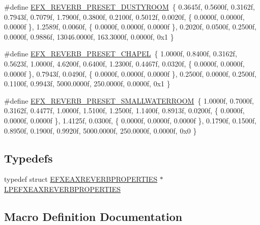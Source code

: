\begin{DoxyCompactItemize}
\item 
\#define \mbox{\hyperlink{efx-presets_8h_a89d300c1e9b8e0eef3cb9de72c18542d}{E\+F\+X\+\_\+\+R\+E\+V\+E\+R\+B\+\_\+\+P\+R\+E\+S\+E\+T\+\_\+\+D\+U\+S\+T\+Y\+R\+O\+OM}}~\{ 0.\+3645f, 0.\+5600f, 0.\+3162f, 0.\+7943f, 0.\+7079f, 1.\+7900f, 0.\+3800f, 0.\+2100f, 0.\+5012f, 0.\+0020f, \{ 0.\+0000f, 0.\+0000f, 0.\+0000f \}, 1.\+2589f, 0.\+0060f, \{ 0.\+0000f, 0.\+0000f, 0.\+0000f \}, 0.\+2020f, 0.\+0500f, 0.\+2500f, 0.\+0000f, 0.\+9886f, 13046.\+0000f, 163.\+3000f, 0.\+0000f, 0x1 \}
\item 
\#define \mbox{\hyperlink{efx-presets_8h_a60e9065d8955c7c33095c82587f815f0}{E\+F\+X\+\_\+\+R\+E\+V\+E\+R\+B\+\_\+\+P\+R\+E\+S\+E\+T\+\_\+\+C\+H\+A\+P\+EL}}~\{ 1.\+0000f, 0.\+8400f, 0.\+3162f, 0.\+5623f, 1.\+0000f, 4.\+6200f, 0.\+6400f, 1.\+2300f, 0.\+4467f, 0.\+0320f, \{ 0.\+0000f, 0.\+0000f, 0.\+0000f \}, 0.\+7943f, 0.\+0490f, \{ 0.\+0000f, 0.\+0000f, 0.\+0000f \}, 0.\+2500f, 0.\+0000f, 0.\+2500f, 0.\+1100f, 0.\+9943f, 5000.\+0000f, 250.\+0000f, 0.\+0000f, 0x1 \}
\item 
\#define \mbox{\hyperlink{efx-presets_8h_aa3515cb632217a8fb55f06da1a4a7d1e}{E\+F\+X\+\_\+\+R\+E\+V\+E\+R\+B\+\_\+\+P\+R\+E\+S\+E\+T\+\_\+\+S\+M\+A\+L\+L\+W\+A\+T\+E\+R\+R\+O\+OM}}~\{ 1.\+0000f, 0.\+7000f, 0.\+3162f, 0.\+4477f, 1.\+0000f, 1.\+5100f, 1.\+2500f, 1.\+1400f, 0.\+8913f, 0.\+0200f, \{ 0.\+0000f, 0.\+0000f, 0.\+0000f \}, 1.\+4125f, 0.\+0300f, \{ 0.\+0000f, 0.\+0000f, 0.\+0000f \}, 0.\+1790f, 0.\+1500f, 0.\+8950f, 0.\+1900f, 0.\+9920f, 5000.\+0000f, 250.\+0000f, 0.\+0000f, 0x0 \}
\end{DoxyCompactItemize}
\subsection*{Typedefs}
\begin{DoxyCompactItemize}
\item 
typedef struct \mbox{\hyperlink{struct_e_f_x_e_a_x_r_e_v_e_r_b_p_r_o_p_e_r_t_i_e_s}{E\+F\+X\+E\+A\+X\+R\+E\+V\+E\+R\+B\+P\+R\+O\+P\+E\+R\+T\+I\+ES}} $\ast$ \mbox{\hyperlink{efx-presets_8h_adc46e4b6e623551dd7ef8b35f268461d}{L\+P\+E\+F\+X\+E\+A\+X\+R\+E\+V\+E\+R\+B\+P\+R\+O\+P\+E\+R\+T\+I\+ES}}
\end{DoxyCompactItemize}


\subsection{Macro Definition Documentation}
\mbox{\label{efx-presets_8h_a9d007a740c938eb36c9bc66020999706}} 
